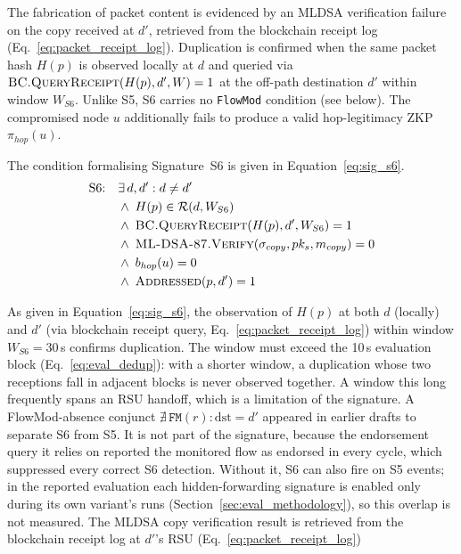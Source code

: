 \documentclass[12pt, a4paper]{report}
\begin{document}
The fabrication of packet content is evidenced by an
\ac{MLDSA} verification failure on the copy received
at $d'$, retrieved from the blockchain receipt log
(Eq.~\ref{eq:packet_receipt_log}). Duplication is
confirmed when the same packet hash $H(p)$ is
observed locally at $d$ and queried via
$\textsc{BC.QueryReceipt}(H(p),d',W)=1$ at the
off-path destination $d'$ within window $W_{S6}$.
Unlike S5, S6 carries no \texttt{FlowMod} condition
(see below). The compromised
node $u$ additionally fails to produce a valid
hop-legitimacy \ac{ZKP} $\pi_{hop}(u)$.

The condition formalising Signature~S6 is given in
Equation~\eqref{eq:sig_s6}.
\begin{equation}
\begin{aligned}
\text{S6:}\quad
  & \exists\, d, d' : d \neq d' \\
  & \wedge\; H(p) \in \mathcal{R}(d, W_{S6}) \\
  & \wedge\; \textsc{BC.QueryReceipt}(H(p), d', W_{S6})
    = 1 \\
  & \wedge\; \textsc{ML-DSA-87.Verify}(
    \sigma_{copy}, pk_s, m_{copy}) = 0 \\
  & \wedge\; b_{hop}(u) = 0 \\
  & \wedge\; \textsc{Addressed}(p, d') = 1
\end{aligned}
\label{eq:sig_s6}
\end{equation}

As given in Equation~\eqref{eq:sig_s6}, the
observation of $H(p)$ at both $d$ (locally) and $d'$
(via blockchain receipt query,
Eq.~\ref{eq:packet_receipt_log}) within window
$W_{S6}=30$\,s confirms duplication. The window must
exceed the 10\,s evaluation block
(Eq.~\ref{eq:eval_dedup}): with a shorter window, a
duplication whose two receptions fall in adjacent
blocks is never observed together. A window this long
frequently spans an \ac{RSU} handoff, which is a
limitation of the signature. A \ac{FlowMod}-absence
conjunct $\nexists\,\texttt{FM}(r){:}\text{dst}{=}d'$
appeared in earlier drafts to separate S6 from S5. It
is not part of the signature, because the endorsement
query it relies on reported the monitored flow as
endorsed in every cycle, which suppressed every
correct S6 detection. Without it, S6 can also fire on
S5 events; in the reported evaluation each
hidden-forwarding signature is enabled only during its
own variant's runs
(Section~\ref{sec:eval_methodology}), so this overlap
is not measured.
The \ac{MLDSA} copy verification result is retrieved
from the blockchain receipt log at $d'$'s \ac{RSU}
(Eq.~\ref{eq:packet_receipt_log})
\end{document}
